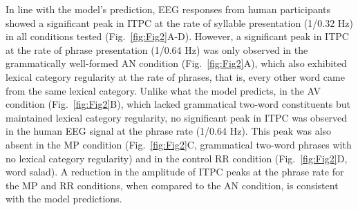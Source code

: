 \documentclass[10pt,letterpaper]{article}
\begin{document}
In line with the model's prediction, EEG responses from human participants showed a significant peak in ITPC at the rate of syllable presentation (1/0.32 Hz) in all conditions tested (Fig.~\ref{fig:Fig2}A-D). However, a significant peak in ITPC at the rate of phrase presentation (1/0.64 Hz) was only observed in the grammatically well-formed AN condition (Fig.~\ref{fig:Fig2}A), which also exhibited lexical category regularity at the rate of phrases, that is, every other word came from the same lexical category. Unlike what the model predicts, in the AV condition (Fig.~\ref{fig:Fig2}B), which lacked grammatical two-word constituents but maintained lexical category regularity, no significant peak in ITPC was observed in the human EEG signal at the phrase rate (1/0.64 Hz). This peak was also absent in the MP condition (Fig.~\ref{fig:Fig2}C, grammatical two-word phrases with no lexical category regularity) and in the control RR condition (Fig.~\ref{fig:Fig2}D, word salad). A reduction in the amplitude of ITPC peaks at the phrase rate for the MP and RR conditions, when compared to the AN condition, is consistent with the model predictions.
\end{document}
